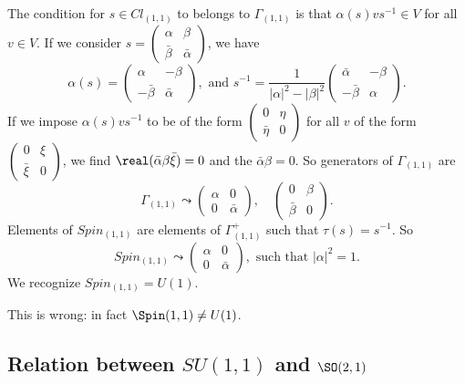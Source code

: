 The condition for $s\in Cl_{(1,1)}$ to belongs to $\Gamma_{(1,1)}$ is that $\alpha(s)v s^{-1}\in V$ for all $v\in V$. If we consider $s=
	\begin{pmatrix}
		\alpha & \beta \\\bar\beta&\bar\alpha
	\end{pmatrix}$,
we have
\[
	\alpha(s)=
	\begin{pmatrix}
		\alpha & -\beta \\-\bar\beta&\bar\alpha
	\end{pmatrix},
	\text{ and }
	s^{-1}=\frac{1}{ | \alpha |^2-| \beta |^2 }
	\begin{pmatrix}
		\bar\alpha & -\beta \\-\bar\beta&\alpha
	\end{pmatrix}.
\]
If we impose $\alpha(s)v s^{-1}$ to be of the form $\begin{pmatrix}
		0 & \eta \\\bar\eta&0
	\end{pmatrix}$ for all $v$ of the form $\begin{pmatrix}
		0 & \xi \\\bar\xi&0
	\end{pmatrix}$, we find $\real(\bar\alpha\beta\bar\xi)=0$ and the $\bar\alpha\beta=0$. So generators of $\Gamma_{(1,1)}$ are
\begin{equation}
	\Gamma_{(1,1)}\leadsto
	\begin{pmatrix}
		\alpha & 0 \\0&\bar\alpha
	\end{pmatrix},\quad
	\begin{pmatrix}
		0 & \beta \\\bar\beta&0
	\end{pmatrix}.
\end{equation}
Elements of $Spin_{(1,1)}$ are elements of $\Gamma_{(1,1)}^+$ such that $\tau(s)=s^{-1}$. So
\begin{equation}
	Spin_{(1,1)}\leadsto
	\begin{pmatrix}
		\alpha & 0 \\0&\bar\alpha
	\end{pmatrix},\text{ such that }| \alpha |^2=1.
\end{equation}
We recognize $Spin_{(1,1)}=U(1)$.

\begin{probleme}
	This is wrong: in fact $\Spin(1,1)\neq U(1)$.
\end{probleme}

\subsection{Relation between \texorpdfstring{$SU(1,1)$}{SU(1,1)} and \texorpdfstring{$\SO(2,1)$}{SO(2,1)}}

